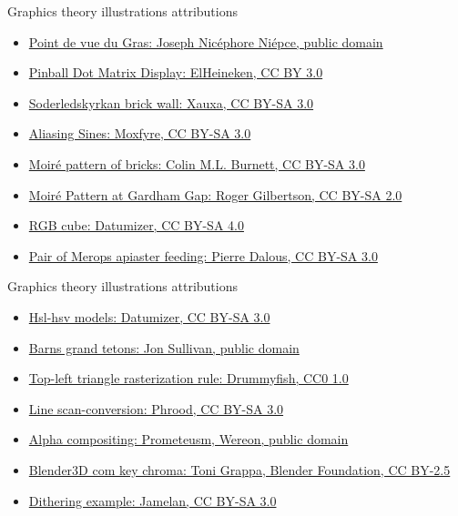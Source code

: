 \begin{frame}{Graphics theory illustrations attributions}
  \small
  \begin{itemize}
  \item \href{https://commons.wikimedia.org/wiki/File:View_from_the_Window_at_Le_Gras,_Joseph_Nic\%C3\%A9phore_Ni\%C3\%A9pce.jpg}{Point de vue du Gras: Joseph Nicéphore Niépce, public domain}
  \item \href{https://commons.wikimedia.org/wiki/File:Pinball_Dot_Matrix_Display_-_Demolition_Man.JPG}{Pinball Dot Matrix Display: ElHeineken, CC BY 3.0}
  \item \href{https://commons.wikimedia.org/wiki/File:Soderledskyrkan_brick_wall.jpg}{Soderledskyrkan brick wall: Xauxa, CC BY-SA 3.0}
  \item \href{https://commons.wikimedia.org/wiki/File:AliasingSines.svg}{Aliasing Sines: Moxfyre, CC BY-SA 3.0}
  \item \href{https://commons.wikimedia.org/wiki/File:Moire_pattern_of_bricks.jpg}{Moiré pattern of bricks: Colin M.L. Burnett, CC BY-SA 3.0}
  \item \href{https://commons.wikimedia.org/wiki/File:Moire_pattern_of_bricks_small.jpg}{Moiré Pattern at Gardham Gap: Roger Gilbertson, CC BY-SA 2.0}
  \item \href{https://commons.wikimedia.org/wiki/File:RGBCube_a.svg}{RGB cube: Datumizer, CC BY-SA 4.0}
  \item \href{https://commons.wikimedia.org/wiki/File:Pair_of_Merops_apiaster_feeding.jpg}{Pair of Merops apiaster feeding: Pierre Dalous, CC BY-SA 3.0}
  \end{itemize}
\end{frame}

\begin{frame}{Graphics theory illustrations attributions}
  \small
  \begin{itemize}
  \item \href{https://commons.wikimedia.org/wiki/File:Hsl-hsv_models_b.svg}{Hsl-hsv models: Datumizer, CC BY-SA 3.0}
  \item \href{https://commons.wikimedia.org/wiki/File:Barns_grand_tetons.jpg}{Barns grand tetons: Jon Sullivan, public domain}
  \item \href{https://commons.wikimedia.org/wiki/File:Top-left_triangle_rasterization_rule.gif}{Top-left triangle rasterization rule: Drummyfish, CC0 1.0}
  \item \href{https://commons.wikimedia.org/wiki/File:Line_scan-conversion.svg}{Line scan-conversion: Phrood, CC BY-SA 3.0}
  \item \href{https://commons.wikimedia.org/wiki/File:Alpha_compositing.svg}{Alpha compositing: Prometeusm, Wereon, public domain}
  \item \href{https://commons.wikimedia.org/wiki/File:Blender3D_com_key_chroma.jpg}{Blender3D com key chroma: Toni Grappa, Blender Foundation, CC BY-2.5}
  \item \href{https://en.wikipedia.org/wiki/File:Dithering_example_dithered_web_palette.png}{Dithering example: Jamelan, CC BY-SA 3.0}
  \end{itemize}
\end{frame}
